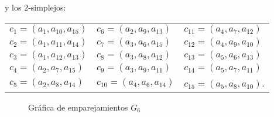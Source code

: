 \documentclass[12pt]{book}
\theoremstyle{definition}
\newcounter{in}
\begin{document}
y los $2$-simplejos:
\begin{center}
  \begin{tabular}[h]{lll}
    $c_{1}=(a_{1},a_{10},a_{15})$ & $c_{6}=(a_{2},a_{9},a_{13})$ & $c_{11}=(a_{4},a_{7},a_{12})$  \\
    $c_{2}=(a_{1},a_{11},a_{14})$ & $c_{7}=(a_{3},a_{6},a_{15})$ & $c_{12}=(a_{4},a_{9},a_{10})$  \\
    $c_{3}=(a_{1},a_{12},a_{13})$ & $c_{8}=(a_{3},a_{8},a_{12})$ & $c_{13}=(a_{5},a_{6},a_{13})$  \\
    $c_{4}=(a_{2},a_{7},a_{15})$ & $c_{9}=(a_{3},a_{9},a_{11})$ & $c_{14}=(a_{5},a_{7},a_{11})$  \\
    $c_{5}=(a_{2},a_{8},a_{14})$ & $c_{10}=(a_{4},a_{6},a_{14})$ & $c_{15}=(a_{5},a_{8},a_{10})$.  
  \end{tabular}
\end{center}

\begin{figure}[h]
  \centering
  
  \caption{Gráfica de emparejamientos $G_{6}$}
  \label{fig:emparejamiento6}
\end{figure}
\end{document}
